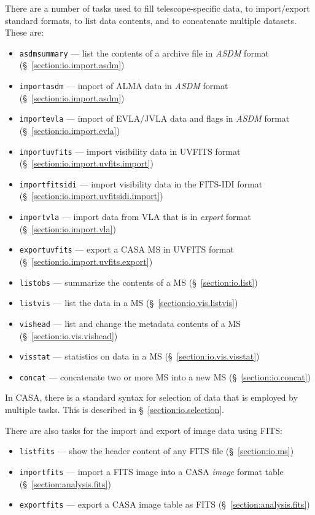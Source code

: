 There are a number of tasks used to fill telescope-specific data,
to import/export standard formats, to list data contents, and
to concatenate multiple datasets.  These are:
\begin{itemize}
   \item {\tt asdmsummary} --- list the contents of a archive file in
     {\it ASDM} format (\S~\ref{section:io.import.asdm})
   \item {\tt importasdm} --- import of ALMA data in 
         {\it ASDM} format (\S~\ref{section:io.import.asdm})
   \item {\tt importevla} --- import of EVLA/JVLA data and flags in 
         {\it ASDM} format (\S~\ref{section:io.import.evla})
   \item {\tt importuvfits} --- import visibility data in UVFITS
         format (\S~\ref{section:io.import.uvfits.import})
   \item {\tt importfitsidi} --- import visibility data in the
     FITS-IDI format (\S~\ref{section:io.import.uvfitsidi.import})
   \item {\tt importvla} --- import data from VLA that is in 
         {\it export} format (\S~\ref{section:io.import.vla})
   \item {\tt exportuvfits} --- export a CASA MS in UVFITS format 
         (\S~\ref{section:io.import.uvfits.export})
   \item {\tt listobs} --- summarize the contents of a MS 
         (\S~\ref{section:io.list})
   \item {\tt listvis} --- list the data in a MS 
         (\S~\ref{section:io.vis.listvis})
   \item {\tt vishead} --- list and change the metadata contents of a MS 
         (\S~\ref{section:io.vis.vishead})
   \item {\tt visstat} --- statistics on data in a MS 
         (\S~\ref{section:io.vis.visstat})
   \item {\tt concat} --- concatenate two or more MS into a
         new MS (\S~\ref{section:io.concat})
\end{itemize}

In CASA, there is a standard syntax for selection of data that
is employed by multiple tasks.  
This is described in \S~\ref{section:io.selection}.

There are also tasks for the import and export of image data using
FITS:
\begin{itemize}
   \item {\tt listfits} --- show the header content of any FITS file
         (\S~\ref{section:io.ms})
   \item {\tt importfits} --- import a FITS image into a CASA  
         {\it image} format table 
         (\S~\ref{section:analysis.fits})
   \item {\tt exportfits} --- export a CASA image table as FITS 
         (\S~\ref{section:analysis.fits})
\end{itemize}

